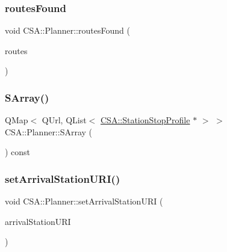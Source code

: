 \mbox{\label{classCSA_1_1Planner_aef9242efc2f34759d0bc58da60b10baf}} 
\subsubsection{\texorpdfstring{routes\+Found}{routesFound}}
{\footnotesize\ttfamily void C\+S\+A\+::\+Planner\+::routes\+Found (\begin{DoxyParamCaption}\item[{const Q\+List$<$ \mbox{\hyperlink{classCSA_1_1Route}{C\+S\+A\+::\+Route}} $\ast$$>$ \&}]{routes }\end{DoxyParamCaption})\hspace{0.3cm}{\ttfamily [signal]}}

\mbox{\label{classCSA_1_1Planner_af8b23db7e72d8bf8d7a219d569c853c6}} 
\subsubsection{\texorpdfstring{S\+Array()}{SArray()}}
{\footnotesize\ttfamily Q\+Map$<$ Q\+Url, Q\+List$<$ \mbox{\hyperlink{classCSA_1_1StationStopProfile}{C\+S\+A\+::\+Station\+Stop\+Profile}} $\ast$ $>$ $>$ C\+S\+A\+::\+Planner\+::\+S\+Array (\begin{DoxyParamCaption}{ }\end{DoxyParamCaption}) const\hspace{0.3cm}{\ttfamily [private]}}

\mbox{\label{classCSA_1_1Planner_aab52e8e5b484f773a33923fd3f29be25}} 
\subsubsection{\texorpdfstring{set\+Arrival\+Station\+U\+R\+I()}{setArrivalStationURI()}}
{\footnotesize\ttfamily void C\+S\+A\+::\+Planner\+::set\+Arrival\+Station\+U\+RI (\begin{DoxyParamCaption}\item[{const Q\+Url \&}]{arrival\+Station\+U\+RI }\end{DoxyParamCaption})}

